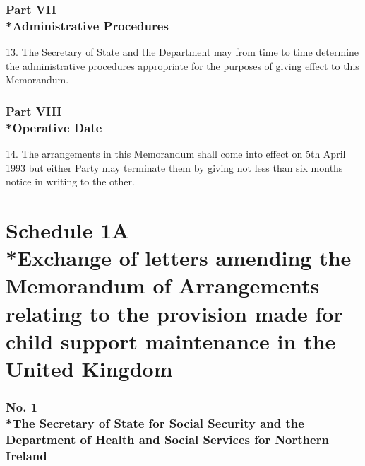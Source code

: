 \documentclass[12pt,a4paper]{article}
\begin{document}

\section[Part VII --- Administrative Procedures]{Part VII\\*Administrative Procedures}

\renewcommand\parthead{--- Schedule 1 Part VII}

13.   The Secretary of State and the Department may from time to time determine the administrative procedures appropriate for the purposes of giving effect to this Memorandum.

\section[Part VIII --- Operative Date]{Part VIII\\*Operative Date}

\renewcommand\parthead{--- Schedule 1 Part VIII}

14.   The arrangements in this Memorandum shall come into effect on 5th April 1993 but either Party may terminate them by giving not less than six months notice in writing to the other.

\part[Schedule 1A --- Exchange of letters amending the Memorandum of Arrangements relating to the provision made for child support maintenance in the United Kingdom]{Schedule 1A\\*Exchange of letters amending the Memorandum of Arrangements relating to the provision made for child support maintenance in the United Kingdom}

\renewcommand\parthead{--- Schedule 1A}


\section*{No. 1\\*The Secretary of State for Social Security and the Department of Health and Social Services for Northern Ireland}
\end{document}
